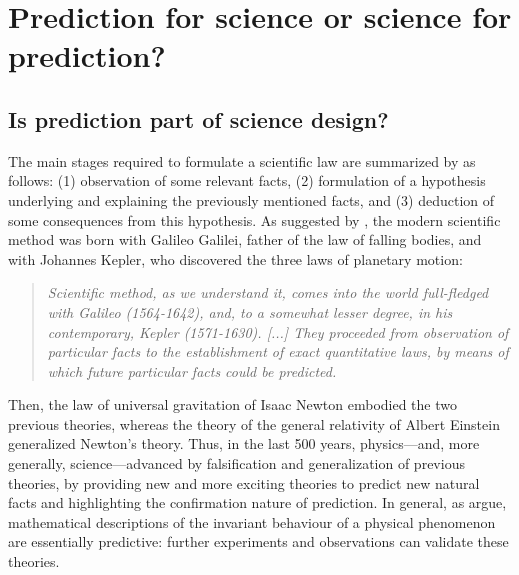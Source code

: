 \documentclass{statsoc}
\begin{document}
\section{Prediction for science or science for prediction?}
\label{sec:pred}

\subsection{Is prediction part of science design?}

\color{black}

The main stages required to formulate a scientific law are summarized by \cite{russell2017scientific} as follows:
(1) observation of some relevant facts,
(2) formulation of a hypothesis underlying and explaining the previously mentioned facts, and
(3) deduction of some consequences from this hypothesis.
As suggested by \cite{russell2017scientific}, the modern scientific method was born with Galileo Galilei, father of the law of falling bodies, and with Johannes Kepler, who discovered the three laws of planetary motion:
%
 \begin{quote}
 \emph{
Scientific method, as we understand it, comes into the
world full-fledged with Galileo (1564-1642), and, to a
somewhat lesser degree, in his contemporary, Kepler
(1571-1630). [...] They proceeded from observation of
particular facts to the establishment of exact quantitative
laws, by means of which future particular facts could be
predicted.
}
\end{quote}
%
 Then, the law of universal gravitation of Isaac Newton embodied the two previous theories, whereas the theory of the general relativity of Albert Einstein generalized  Newton's theory.
Thus, in the last 500 years, physics---and, more generally, science---advanced by falsification and generalization of previous theories, by providing new and more exciting theories to predict new natural facts and highlighting the confirmation nature of prediction. In general,  as \cite{hitchcock2004prediction} argue,   mathematical descriptions of the 
invariant behaviour of a physical phenomenon are essentially predictive: further experiments and observations can validate these theories. 
\end{document}

